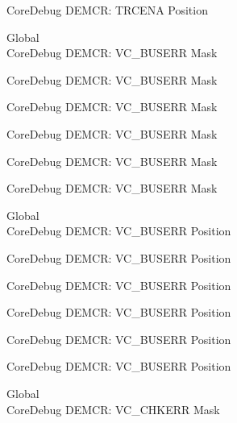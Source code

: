 \begin{DoxyRefList}
\label{deprecated__deprecated000598}%
%
Core\+Debug DEMCR\+: TRCENA Position  
\item[Global \doxylink{group___c_m_s_i_s___core_debug_ga9d29546aefe3ca8662a7fe48dd4a5b2b}{Core\+Debug\+\_\+\+DEMCR\+\_\+\+VC\+\_\+\+BUSERR\+\_\+\+Msk} ]\hfill \\
\label{deprecated__deprecated000060}%
%
Core\+Debug DEMCR\+: VC\+\_\+\+BUSERR Mask 

\label{deprecated__deprecated000204}%
%
Core\+Debug DEMCR\+: VC\+\_\+\+BUSERR Mask 

\label{deprecated__deprecated000346}%
%
Core\+Debug DEMCR\+: VC\+\_\+\+BUSERR Mask 

\label{deprecated__deprecated000422}%
%
Core\+Debug DEMCR\+: VC\+\_\+\+BUSERR Mask 

\label{deprecated__deprecated000511}%
%
Core\+Debug DEMCR\+: VC\+\_\+\+BUSERR Mask 

\label{deprecated__deprecated000613}%
%
Core\+Debug DEMCR\+: VC\+\_\+\+BUSERR Mask  
\item[Global \doxylink{group___c_m_s_i_s___core_debug_gab8e3d8f0f9590a51bbf10f6da3ad6933}{Core\+Debug\+\_\+\+DEMCR\+\_\+\+VC\+\_\+\+BUSERR\+\_\+\+Pos} ]\hfill \\
\label{deprecated__deprecated000059}%
%
Core\+Debug DEMCR\+: VC\+\_\+\+BUSERR Position 

\label{deprecated__deprecated000203}%
%
Core\+Debug DEMCR\+: VC\+\_\+\+BUSERR Position 

\label{deprecated__deprecated000345}%
%
Core\+Debug DEMCR\+: VC\+\_\+\+BUSERR Position 

\label{deprecated__deprecated000421}%
%
Core\+Debug DEMCR\+: VC\+\_\+\+BUSERR Position 

\label{deprecated__deprecated000510}%
%
Core\+Debug DEMCR\+: VC\+\_\+\+BUSERR Position 

\label{deprecated__deprecated000612}%
%
Core\+Debug DEMCR\+: VC\+\_\+\+BUSERR Position  
\item[Global \doxylink{group___c_m_s_i_s___core_debug_ga2f98b461d19746ab2febfddebb73da6f}{Core\+Debug\+\_\+\+DEMCR\+\_\+\+VC\+\_\+\+CHKERR\+\_\+\+Msk} ]\hfill \\
\label{deprecated__deprecated000064}%
%
Core\+Debug DEMCR\+: VC\+\_\+\+CHKERR Mask 


\end{DoxyRefList}
